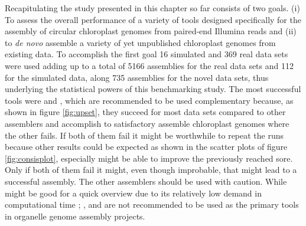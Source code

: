 Recapitulating the study presented in this chapter so far consists of two goals. (i) To assess the overall
performance of a variety of tools designed specifically for the assembly of circular chloroplast genomes from
paired-end Illumina reads and (ii) to \textit{de novo} assemble a variety of yet unpublished chloroplast
genomes from existing data. To accomplish the first goal 16 simulated and 369 real data sets were used adding
up to a total of 5166 assemblies for the real data sets and 112 for the simulated data, along 735 assemblies
for the novel data sets, thus underlying the statistical powers of this benchmarking study. The most
successful tools were \go \hspace{.5ex} and \fp, which are recommended to be used complementary because, as
shown in figure \ref{fig:upset}, they succeed for most data sets compared to other assemblers and accomplish
to satisfactory assemble chloroplast genomes where the other fails. If both of them fail it might be
worthwhile to repeat the runs because other results could be expected as shown in the scatter plots of figure
\ref{fig:consisplot}, especially \fp \hspace{.5ex} might be able to improve the previously reached sore. Only
if both of them fail it might, even though improbable, that \np might lead to a successful assembly. The other
assemblers should be used with caution. While \ce \hspace{.5ex} might be good for a quick overview due to its
relatively low demand in computational time \cite{freudenthal2019landscape}; \cassp, \oa \hspace{.5ex} and
\ioga \hspace{.5ex} are not recommended to be used as the primary tools in organelle genome assembly projects.

